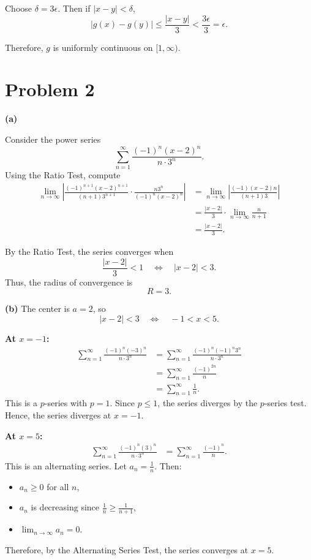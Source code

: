 \documentclass[12pt]{article}
\begin{document}
Choose $\delta = 3\epsilon$. Then if $|x-y| < \delta$,
\[
|g(x) - g(y)| \le \frac{|x-y|}{3} < \frac{3\epsilon}{3} = \epsilon.
\]

Therefore, $g$ is uniformly continuous on $[1,\infty)$.

\section*{Problem 2}
\textbf{(a)} 

Consider the power series
\[
\sum_{n=1}^{\infty} \frac{(-1)^n (x-2)^n}{n \cdot 3^n}.
\]
Using the Ratio Test, compute
\begin{align*}
\lim_{n \to \infty} \left| \frac{(-1)^{n+1}(x-2)^{n+1}}{(n+1)3^{n+1}} \cdot \frac{n3^n}{(-1)^n (x-2)^n} \right|
&= \lim_{n \to \infty} \left| \frac{(-1)(x-2)n}{(n+1)3} \right| \\
&= \frac{|x-2|}{3} \cdot \lim_{n \to \infty} \frac{n}{n+1} \\
&= \frac{|x-2|}{3}.
\end{align*}

By the Ratio Test, the series converges when
\[
\frac{|x-2|}{3} < 1 \quad \Longleftrightarrow \quad |x-2| < 3.
\]
Thus, the radius of convergence is
\[
R = 3.
\]

\bigskip

\textbf{(b)} 
The center is $a = 2$, so
\[
|x-2| < 3 \quad \Longleftrightarrow \quad -1 < x < 5.
\]

\medskip

\textbf{At $x = -1$:}
\begin{align*}
\sum_{n=1}^{\infty} \frac{(-1)^n (-3)^n}{n \cdot 3^n}
&= \sum_{n=1}^{\infty} \frac{(-1)^n (-1)^n 3^n}{n \cdot 3^n} \\
&= \sum_{n=1}^{\infty} \frac{(-1)^{2n}}{n} \\
&= \sum_{n=1}^{\infty} \frac{1}{n}.
\end{align*}
This is a $p$-series with $p = 1$. Since $p \le 1$, the series diverges by the $p$-series test. Hence, the series diverges at $x=-1$.

\medskip

\textbf{At $x = 5$:}
\begin{align*}
\sum_{n=1}^{\infty} \frac{(-1)^n (3)^n}{n \cdot 3^n}
&= \sum_{n=1}^{\infty} \frac{(-1)^n}{n}.
\end{align*}
This is an alternating series. Let $a_n = \frac{1}{n}$. Then:
\begin{itemize}
\item $a_n \ge 0$ for all $n$,
\item $a_n$ is decreasing since $\frac{1}{n} \ge \frac{1}{n+1}$,
\item $\lim_{n \to \infty} a_n = 0$.
\end{itemize}
Therefore, by the Alternating Series Test, the series converges at $x=5$.
\end{document}
